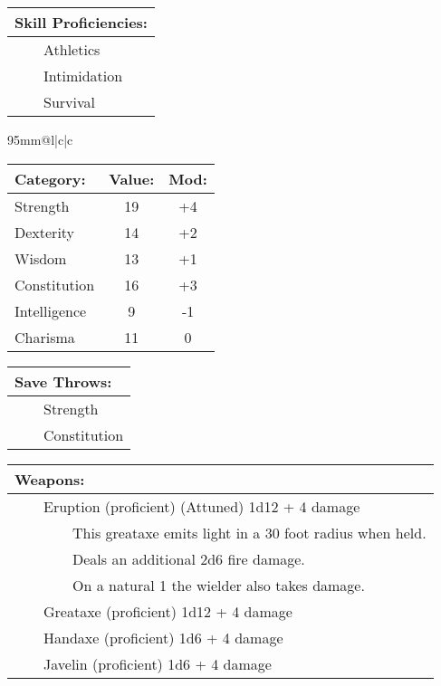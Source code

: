 \documentclass[11pt]{article}
\newcommand{\tabitem}{~~\llap{--}~~}
\newcommand{\tabtabitem}{~~~~~~\llap{$\bullet$}~~}
\begin{document}
\begin{multicols}{2}
\vspace{2mm}

\noindent \begin{tabularx}{95mm}{@{}l}
{\Large \textbf{Skill Proficiencies:}} \\
\hline
\tabitem Athletics \\
\tabitem Intimidation \\
\tabitem Survival
		\end{tabularx}

\vspace{4mm}

\noindent \begin{tabularx}{95mm}{@{}l|c|c}
 \\
\hline
		\end{tabularx}
\noindent \begin{tabular}{@{}l|c|c}
\textbf{Category:} 			& \textbf{Value:} 	& \textbf{Mod:} \\
\hline
Strength 					& 19 				& +4		\\
Dexterity 					& 14 				& +2		\\
Wisdom 						& 13				& +1		\\
Constitution 				& 16 				& +3		\\
Intelligence 				& 9 				& -1		\\
Charisma 					& 11 				& 0
		\end{tabular}

\vspace{4mm}

\noindent \begin{tabularx}{95mm}{@{}l}
{\Large \textbf{Save Throws:}} \\
\hline
\tabitem Strength \\
\tabitem Constitution
		\end{tabularx}

\vspace{4mm}

\noindent \begin{tabularx}{95mm}{@{}l}
{\Large \textbf{Weapons:}} \\
\hline
\tabitem Eruption (proficient) (Attuned) 1d12 + 4 damage \\
\tabtabitem This greataxe emits light in a 30 foot radius when held. \\
\tabtabitem Deals an additional 2d6 fire damage. \\
\tabtabitem On a natural 1 the wielder also takes damage. \\
\tabitem Greataxe (proficient) 1d12 + 4 damage \\
\tabitem Handaxe (proficient) 1d6 + 4 damage \\
\tabitem Javelin (proficient) 1d6 + 4 damage
		\end{tabularx}


\end{multicols}
\end{document}
